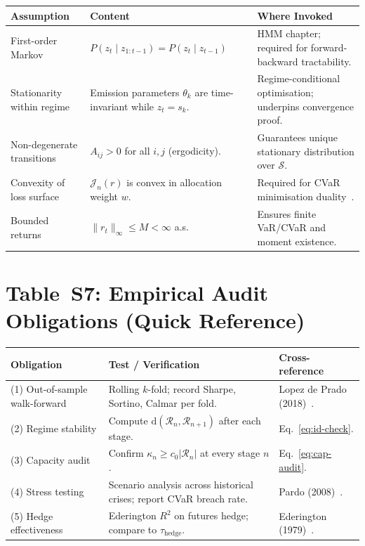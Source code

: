 \documentclass[12pt,openany]{book}
\numberwithin{equation}{chapter}
\theoremstyle{plain}
\theoremstyle{definition}
\theoremstyle{remark}
\numberwithin{equation}{chapter}
\theoremstyle{plain}
\begin{document}
\begin{center}
\begin{tabularx}{\textwidth}{@{} l X X @{}}
\hline
\textbf{Assumption} & \textbf{Content} & \textbf{Where Invoked} \\
\hline
First-order Markov &
  $P(z_t \mid z_{1:t-1}) = P(z_t \mid z_{t-1})$ &
  HMM chapter; required for forward-backward tractability. \\
\addlinespace
Stationarity within regime &
  Emission parameters $\theta_k$ are time-invariant while $z_t = s_k$. &
  Regime-conditional optimisation; underpins convergence proof. \\
\addlinespace
Non-degenerate transitions &
  $A_{ij} > 0$ for all $i,j$ (ergodicity). &
  Guarantees unique stationary distribution over $\mathcal{S}$. \\
\addlinespace
Convexity of loss surface &
  $\mathcal{J}_n(r)$ is convex in allocation weight $w$. &
  Required for CVaR minimisation duality~\cite{R5}. \\
\addlinespace
Bounded returns &
  $\|r_t\|_{\infty} \le M < \infty$ a.s. &
  Ensures finite VaR/CVaR and moment existence. \\
\hline
\end{tabularx}
\end{center}

\section*{Table~S7: Empirical Audit Obligations (Quick Reference)}

\begin{center}
\begin{tabularx}{\textwidth}{@{} l X X @{}}
\hline
\textbf{Obligation} & \textbf{Test / Verification} & \textbf{Cross-reference} \\
\hline
(1) Out-of-sample walk-forward &
  Rolling $k$-fold; record Sharpe, Sortino, Calmar per fold. &
  Lopez de Prado (2018)~\cite{R11}. \\
\addlinespace
(2) Regime stability &
  Compute $\mathrm{d}(\mathcal{R}_n,\mathcal{R}_{n+1})$ after each stage. &
  Eq.~\eqref{eq:id-check}. \\
\addlinespace
(3) Capacity audit &
  Confirm $\kappa_n \ge c_0|\mathcal{R}_n|$ at every stage $n$. &
  Eq.~\eqref{eq:cap-audit}. \\
\addlinespace
(4) Stress testing &
  Scenario analysis across historical crises; report CVaR breach rate. &
  Pardo (2008)~\cite{R12}. \\
\addlinespace
(5) Hedge effectiveness &
  Ederington $R^2$ on futures hedge; compare to $\tau_{\text{hedge}}$. &
  Ederington (1979)~\cite{R7}. \\
\hline
\end{tabularx}
\end{center}
\end{document}
